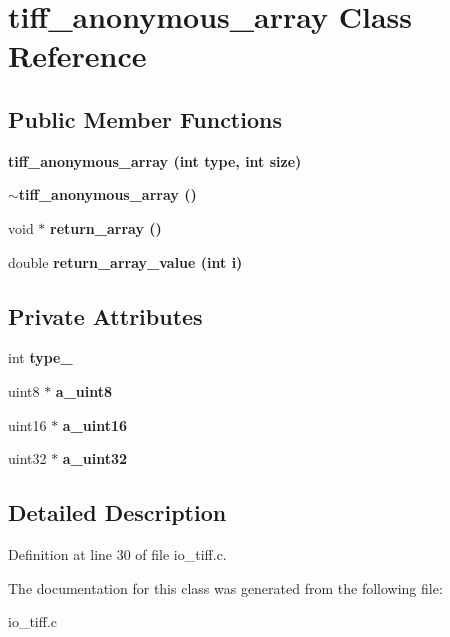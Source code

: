 \section{tiff\_\-anonymous\_\-array Class Reference}
\label{classtiff__anonymous__array}
\subsection*{Public Member Functions}
\begin{CompactItemize}
\item 
\bf{tiff\_\-anonymous\_\-array} (int type, int size)\label{classtiff__anonymous__array_6cd71fc68ab68892989eb9aa2928542c}

\item 
\bf{$\sim$tiff\_\-anonymous\_\-array} ()\label{classtiff__anonymous__array_8173928129129cd675de8a7f88635e20}

\item 
void $\ast$ \bf{return\_\-array} ()\label{classtiff__anonymous__array_318af30ec30b76d236da747d9ea27837}

\item 
double \bf{return\_\-array\_\-value} (int i)\label{classtiff__anonymous__array_7dc7b7e16e4e209aadfa0e516ee09728}

\end{CompactItemize}
\subsection*{Private Attributes}
\begin{CompactItemize}
\item 
int \bf{type\_\-}\label{classtiff__anonymous__array_5338d62c29dc576c1e5a471adc45c193}

\item 
uint8 $\ast$ \bf{a\_\-uint8}\label{classtiff__anonymous__array_58c836e1363553c821d45ac992c91785}

\item 
uint16 $\ast$ \bf{a\_\-uint16}\label{classtiff__anonymous__array_bfb4e652c6f6db8620b7db83316353fb}

\item 
uint32 $\ast$ \bf{a\_\-uint32}\label{classtiff__anonymous__array_aad9e6b66938242fe6702bde5501135f}

\end{CompactItemize}


\subsection{Detailed Description}




Definition at line 30 of file io\_\-tiff.c.

The documentation for this class was generated from the following file:\begin{CompactItemize}
\item 
io\_\-tiff.c\end{CompactItemize}
